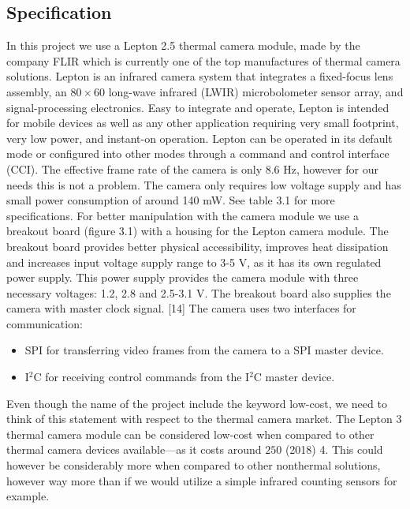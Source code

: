 \subsection{Specification}
\label{ssec:}
In this project we use a Lepton 2.5 thermal camera module, made by the company
FLIR which is currently one of the top manufactures of thermal camera solutions.
Lepton is an infrared camera system that integrates a fixed-focus lens assembly,
an $80 \times 60$ long-wave infrared (LWIR) microbolometer sensor array, and
signal-processing electronics. Easy to integrate and operate, Lepton is intended
for mobile devices as well as any other application requiring very small
footprint, very low power, and instant-on operation. Lepton can be operated in
its default mode or configured into other modes through a command and control
interface (CCI). The effective frame rate of the camera is only 8.6 \si{\hertz},
however for our needs this is not a problem. The camera only requires low
voltage supply and has small power consumption of around 140 \si{\milli\watt}.
See table 3.1 for more specifications. For better manipulation with the camera
module we use a breakout board (figure 3.1) with a housing for the Lepton camera
module. The breakout board provides better physical accessibility, improves heat
dissipation and increases input voltage supply range to 3-5 \si{\volt}, as it has its
own regulated power supply. This power supply provides the camera module with
three necessary voltages: 1.2, 2.8 and 2.5-3.1 \si{\volt}. The breakout board
also supplies the camera with master clock signal. [14] The camera uses two
interfaces for communication:
\begin{itemize}
    \item SPI for transferring video frames from the camera to a SPI master
device.
    \item I$^{2}$C for receiving control commands from the I$^{2}$C master
device.
\end{itemize}
Even though the name of the project include the keyword low-cost, we need to
think of this statement with respect to the thermal camera market. The Lepton 3
thermal camera module can be considered low-cost when compared to other thermal
camera devices available—as it costs around $250$ (2018) 4. This could however
be considerably more when compared to other nonthermal solutions, however way
more than if we would utilize a simple infrared counting sensors for example.
%
